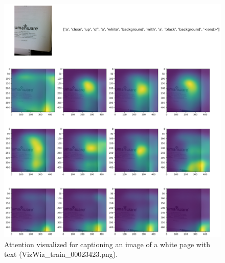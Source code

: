 \documentclass[11pt,a4paper]{article}
\begin{document}
\begin{figure}[ht]
  \includegraphics[width=\linewidth]{VizWiz_train_00023423.png}
  \caption{Attention visualized for captioning an image of a white page with text (VizWiz\_train\_00023423.png).}
  \label{fig:whitetext}
\end{figure}
\end{document}
